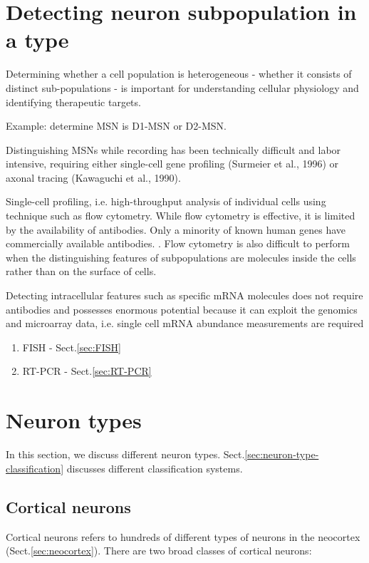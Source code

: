\section{Detecting neuron subpopulation in a type}

Determining whether a cell population is heterogeneous - whether it consists of
distinct sub-populations - is important for understanding cellular physiology
and identifying therapeutic targets.

Example: determine MSN is D1-MSN or D2-MSN.

Distinguishing MSNs while recording has been technically difficult and labor
intensive, requiring either single-cell gene profiling (Surmeier et al., 1996)
or axonal tracing (Kawaguchi et al., 1990).

Single-cell profiling, i.e. high-throughput analysis of individual cells using
technique such as flow cytometry.  While flow cytometry is effective, it is
limited by the availability of antibodies. Only a minority of known human genes
have commercially available antibodies. . Flow cytometry is also difficult to
perform when the distinguishing features of subpopulations are molecules inside
the cells rather than on the surface of cells.

Detecting intracellular features such as specific mRNA molecules does not
require antibodies and possesses enormous potential because it can exploit the
genomics and microarray data, i.e.  single cell mRNA abundance measurements are
required
\begin{enumerate}
  \item FISH - Sect.\ref{sec:FISH}
  \item RT-PCR - Sect.\ref{sec:RT-PCR}
\end{enumerate}




\section{Neuron types}
\label{sec:neuron-types}

In this section, we discuss different neuron types.
Sect.\ref{sec:neuron-type-classification} discusses different classification
systems.

\subsection{Cortical neurons}
\label{sec:cortical-neurons}

Cortical neurons refers to hundreds of different types of neurons in the
neocortex (Sect.\ref{sec:neocortex}). There are two broad classes of cortical
neurons:

